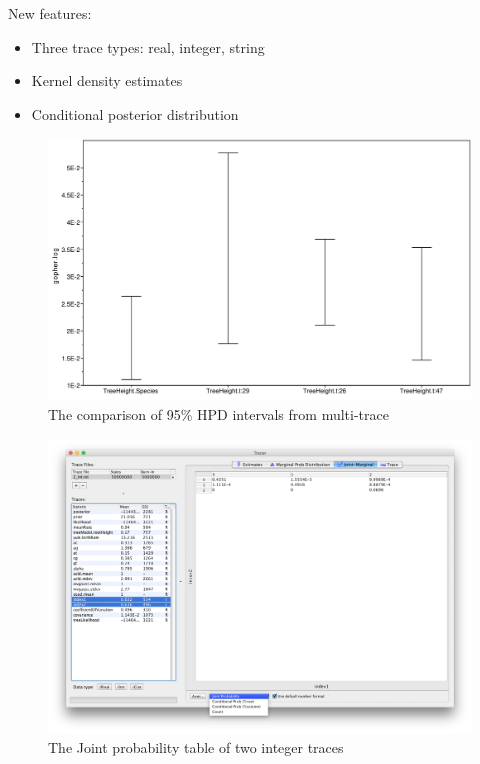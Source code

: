 \documentclass{bioinfo}
\begin{document}
New features:
\begin{itemize}
\item Three trace types: real, integer, string
\item Kernel density estimates
\item Conditional posterior distribution
\end{itemize}

\begin{figure}[H]
\includegraphics[width=.5\textwidth]{./figures/comp-95HPD.pdf}  
\caption{The comparison of  95\% HPD intervals from multi-trace}
\label{fig:comp95HPD}
\end{figure}



\begin{figure}[H]
\includegraphics[width=.5\textwidth]{./figures/jointPrInt.png}  
\caption{The Joint probability table of two integer traces}
\label{fig:int:jointpr}
\end{figure}

\end{document}
